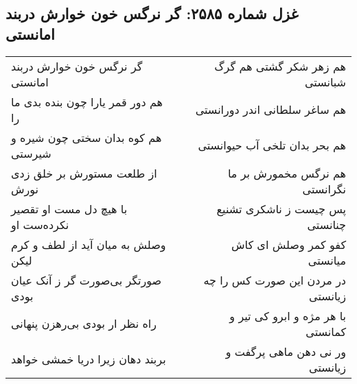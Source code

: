 \begin{center}
\section*{غزل شماره ۲۵۸۵: گر نرگس خون خوارش دربند امانستی}
\label{sec:2585}
\begin{longtable}{l p{0.5cm} r}
گر نرگس خون خوارش دربند امانستی
&&
هم زهر شکر گشتی هم گرگ شبانستی
\\
هم دور قمر یارا چون بنده بدی ما را
&&
هم ساغر سلطانی اندر دورانستی
\\
هم کوه بدان سختی چون شیره و شیرستی
&&
هم بحر بدان تلخی آب حیوانستی
\\
از طلعت مستورش بر خلق زدی نورش
&&
هم نرگس مخمورش بر ما نگرانستی
\\
با هیچ دل مست او تقصیر نکرده‌ست او
&&
پس چیست ز ناشکری تشنیع چنانستی
\\
وصلش به میان آید از لطف و کرم لیکن
&&
کفو کمر وصلش ای کاش میانستی
\\
صورتگر بی‌صورت گر ز آنک عیان بودی
&&
در مردن این صورت کس را چه زیانستی
\\
راه نظر ار بودی بی‌رهزن پنهانی
&&
با هر مژه و ابرو کی تیر و کمانستی
\\
بربند دهان زیرا دریا خمشی خواهد
&&
ور نی دهن ماهی پرگفت و زیانستی
\\
\end{longtable}
\end{center}
